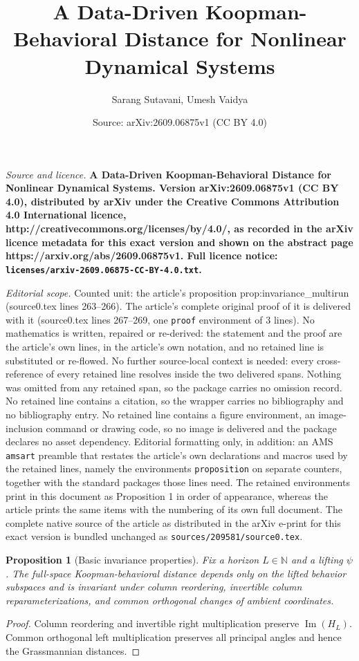 \documentclass[10pt,a4paper]{amsart}
\title{\LARGE \bf A Data-Driven Koopman-Behavioral Distance for Nonlinear Dynamical Systems}
\author{Sarang Sutavani, Umesh Vaidya}
\date{Source: arXiv:2609.06875v1 (CC BY 4.0)}
\newtheorem{proposition}{Proposition}
\DeclareMathOperator*{\im}{Im}
\begin{document}
\maketitle

\noindent\emph{Source and licence.} \LARGE \bf A Data-Driven Koopman-Behavioral Distance for Nonlinear Dynamical Systems. Version arXiv:2609.06875v1 (CC BY 4.0), distributed by arXiv under the Creative Commons Attribution 4.0 International licence, http://creativecommons.org/licenses/by/4.0/, as recorded in the arXiv licence metadata for this exact version and shown on the abstract page https://arxiv.org/abs/2609.06875v1. Full licence notice: \texttt{licenses/arxiv-2609.06875-CC-BY-4.0.txt}.\par\smallskip

\noindent\textit{Editorial scope.} Counted unit: the article's proposition prop:invariance\_multirun (source0.tex lines 263--266). The article's complete original proof of it is delivered with it (source0.tex lines 267--269, one \texttt{proof} environment of 3 lines). No mathematics is written, repaired or re-derived: the statement and the proof are the article's own lines, in the article's own notation, and no retained line is substituted or re-flowed.  No further source-local context is needed: every cross-reference of every retained line resolves inside the two delivered spans.  Nothing was omitted from any retained span, so the package carries no omission record.  No retained line contains a citation, so the wrapper carries no bibliography and no bibliography entry.  No retained line contains a figure environment, an image-inclusion command or drawing code, so no image is delivered and the package declares no asset dependency.  Editorial formatting only, in addition: an AMS \texttt{amsart} preamble that restates the article's own declarations and macros used by the retained lines, namely the environments \texttt{proposition} on separate counters, together with the standard packages those lines need.  The retained environments print in this document as Proposition 1 in order of appearance, whereas the article prints the same items with the numbering of its own full document.  The complete native source of the article as distributed in the arXiv e-print for this exact version is bundled unchanged as \texttt{sources/209581/source0.tex}.
\begin{proposition}[Basic invariance properties]
\label{prop:invariance_multirun}
Fix a horizon $L\in\mathbb N$ and a lifting $\psi$. The full-space Koopman-behavioral distance depends only on the lifted behavior subspaces and is invariant under column reordering, invertible column reparameterizations, and common orthogonal changes of ambient coordinates.
\end{proposition}

\begin{proof}
Column reordering and invertible right multiplication preserve $\im(H_L)$. Common orthogonal left multiplication preserves all principal angles and hence the Grassmannian distances.
\end{proof}
\end{document}
